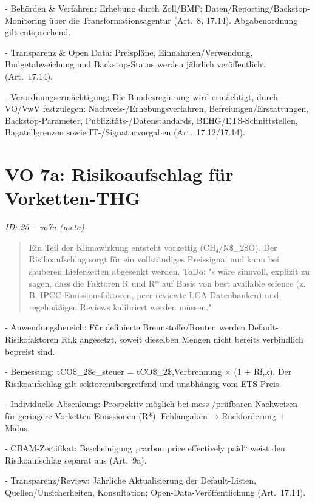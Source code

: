 \documentclass[12pt,a4paper]{scrartcl}
\begin{document}
- Behörden \& Verfahren: Erhebung durch Zoll/BMF; Daten/Reporting/Backstop-Monitoring über die Transformationsagentur (Art. 8, 17.14). Abgabenordnung gilt entsprechend.

- Transparenz \& Open Data: Preispläne, Einnahmen/Verwendung, Budgetabweichung und Backstop-Status werden jährlich veröffentlicht (Art. 17.14).

- Verordnungsermächtigung: Die Bundesregierung wird ermächtigt, durch VO/VwV festzulegen: Nachweis-/Erhebungsverfahren, Befreiungen/Erstattungen, Backstop-Parameter, Publizitäts-/Datenstandards, BEHG/ETS-Schnittstellen, Bagatellgrenzen sowie IT-/Signaturvorgaben (Art. 17.12/17.14).


\section[VO 7a: Risikoaufschlag für Vorketten-THG]{VO 7a: Risikoaufschlag für Vorketten-THG}
\noindent\textit{ID: 25 -- vo7a (meta)}

\begin{quote}
Ein Teil der Klimawirkung entsteht vorkettig (CH₄/N\$\_2\$O). Der Risikoaufschlag sorgt für ein vollständiges Preissignal und kann bei sauberen Lieferketten abgesenkt werden. ToDo: "s wäre sinnvoll, explizit zu sagen, dass die Faktoren R und R* auf Basis von best available science (z. B. IPCC-Emissionsfaktoren, peer-reviewte LCA-Datenbanken) und regelmäßigen Reviews kalibriert werden müssen."
\end{quote}

- Anwendungsbereich: Für definierte Brennstoffe/Routen werden Default-Risikofaktoren Rf,k angesetzt, soweit dieselben Mengen nicht bereits verbindlich bepreist sind.

- Bemessung: tCO\$\_2\$e\_steuer = tCO\$\_2\$,Verbrennung × (1 + Rf,k). Der Risikoaufschlag gilt sektorenübergreifend und unabhängig vom ETS-Preis.

- Individuelle Absenkung: Prospektiv möglich bei mess-/prüfbaren Nachweisen für geringere Vorketten-Emissionen (R*). Fehlangaben → Rückforderung + Malus.

- CBAM-Zertifikat: Bescheinigung „carbon price effectively paid“ weist den Risikoaufschlag separat aus (Art. 9a).

- Transparenz/Review: Jährliche Aktualisierung der Default-Listen, Quellen/Unsicherheiten, Konsultation; Open-Data-Veröffentlichung (Art. 17.14).


\end{document}
